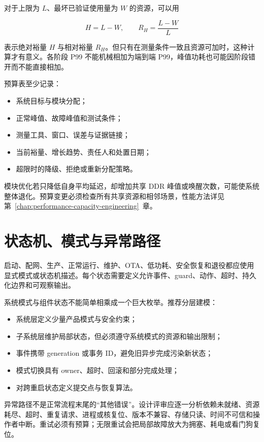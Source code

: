 对于上限为 $L$、最坏已验证使用量为 $W$ 的资源，可以用

\begin{equation}
  H=L-W,\qquad R_H=\frac{L-W}{L}
\end{equation}

表示绝对裕量 $H$ 与相对裕量 $R_H$。但只有在测量条件一致且资源可加时，这种计算才有意义。各阶段 P99 不能机械相加为端到端 P99，峰值功耗也可能因阶段错开而不能直接相加。

预算表至少记录：

\begin{itemize}
  \item 系统目标与模块分配；
  \item 正常峰值、故障峰值和测试条件；
  \item 测量工具、窗口、误差与证据链接；
  \item 当前裕量、增长趋势、责任人和处置日期；
  \item 超限时的降级、拒绝或重新分配策略。
\end{itemize}

模块优化若只降低自身平均延迟，却增加共享 DDR 峰值或唤醒次数，可能使系统整体退化。预算变更必须检查所有共享资源和相邻场景，性能方法详见第~\ref{chap:performance-capacity-engineering}~章。

\section{状态机、模式与异常路径}

启动、配网、生产、正常运行、维护、OTA、低功耗、安全恢复和退役都应使用显式模式或状态机描述。每个状态需要定义允许事件、guard、动作、超时、持久化边界和可观察输出。

系统模式与组件状态不能简单相乘成一个巨大枚举。推荐分层建模：

\begin{itemize}
  \item 系统层定义少量产品模式与安全约束；
  \item 子系统层维护局部状态，但必须遵守系统模式的资源和输出限制；
  \item 事件携带 generation 或事务 ID，避免旧异步完成污染新状态；
  \item 模式切换具有 owner、超时、回滚和部分完成处理；
  \item 对跨重启状态定义提交点与恢复算法。
\end{itemize}

异常路径不是正常流程末尾的“其他错误”。设计评审应逐一分析依赖未就绪、资源耗尽、超时、重复请求、进程或核复位、版本不兼容、存储只读、时间不可信和操作者中断。重试必须有预算；无限重试会把局部故障放大为拥塞、耗电或看门狗复位。

